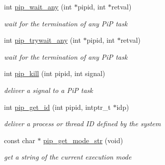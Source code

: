 \begin{DoxyCompactItemize}
\item 
int \hyperlink{group__libpip_gade2b18ac0e11ec827ad68656591c7518}{pip\-\_\-wait\-\_\-any} (int $\ast$pipid, int $\ast$retval)
\begin{DoxyCompactList}\small\item\em wait for the termination of any Pi\-P task \end{DoxyCompactList}\end{DoxyCompactItemize}
\begin{DoxyCompactItemize}
\item 
int \hyperlink{group__libpip_ga65731447fedb85cbe4d5c38093383a20}{pip\-\_\-trywait\-\_\-any} (int $\ast$pipid, int $\ast$retval)
\begin{DoxyCompactList}\small\item\em wait for the termination of any Pi\-P task \end{DoxyCompactList}\end{DoxyCompactItemize}
\begin{DoxyCompactItemize}
\item 
int \hyperlink{group__libpip_ga4a396f38920d94b71dcfd3c898fbb82b}{pip\-\_\-kill} (int pipid, int signal)
\begin{DoxyCompactList}\small\item\em deliver a signal to a Pi\-P task \end{DoxyCompactList}\end{DoxyCompactItemize}
\begin{DoxyCompactItemize}
\item 
int \hyperlink{group__libpip_ga8ed1ba448edbc0f2e0af78abdcc62b7c}{pip\-\_\-get\-\_\-id} (int pipid, intptr\-\_\-t $\ast$idp)
\begin{DoxyCompactList}\small\item\em deliver a process or thread I\-D defined by the system \end{DoxyCompactList}\end{DoxyCompactItemize}
\begin{DoxyCompactItemize}
\item 
const char $\ast$ \hyperlink{group__libpip_ga0e12c95fe7abc5c356acfd45a89ad5d8}{pip\-\_\-get\-\_\-mode\-\_\-str} (void)
\begin{DoxyCompactList}\small\item\em get a string of the current execution mode \end{DoxyCompactList}\end{DoxyCompactItemize}
